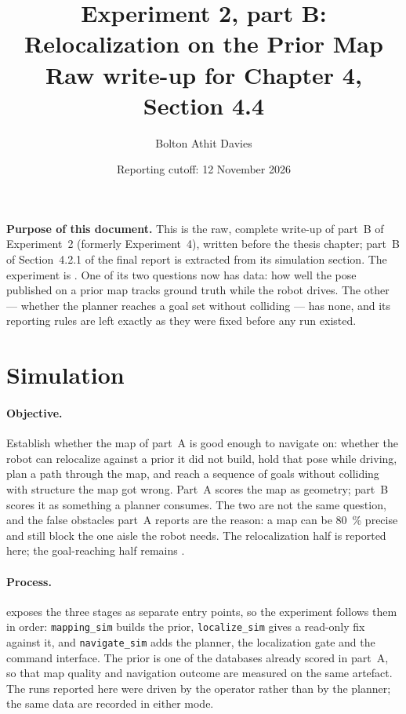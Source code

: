 \documentclass[11pt,a4paper,notitlepage]{report}
\title{Experiment 2, part B: Relocalization on the Prior Map\\
       \large Raw write-up for Chapter 4, Section 4.4}
\author{Bolton Athit Davies}
\date{Reporting cutoff: 12 November 2026}
\begin{document}
\maketitle

\noindent\textbf{Purpose of this document.} This is the raw, complete write-up
of part~B of Experiment~2 (formerly Experiment~4), written before the thesis
chapter; part~B of Section~4.2.1 of the final report is extracted from its
simulation section. The experiment is . One of its two
questions now has data: how well the pose published on a prior map tracks
ground truth while the robot drives. The other --- whether the planner reaches
a goal set without colliding --- has none, and its reporting rules are left
exactly as they were fixed before any run existed.

\FloatBarrier
\section{Simulation}
\label{sec:exp4-sim}


\paragraph{Objective.} Establish whether the map of part~A is good enough to
navigate on: whether the robot can relocalize against a prior it did not build,
hold that pose while driving, plan a path through the map, and reach a sequence
of goals without colliding with structure the map got wrong. Part~A scores the
map as geometry; part~B scores it as something a planner consumes. The two are
not the same question, and the false obstacles part~A reports are the reason: a
map can be
\SI{80}{\percent} precise and still block the one aisle the robot needs. The
relocalization half is reported here; the goal-reaching half remains
.

\paragraph{Process.}  exposes the three stages as
separate entry points, so the experiment follows them in order:
\texttt{mapping\_sim} builds the prior, \texttt{localize\_sim} gives a
read-only fix against it, and \texttt{navigate\_sim} adds the planner, the
localization gate and the command interface. The prior is one of the databases
already scored in part~A, so that map quality and
navigation outcome are measured on the same artefact. The runs reported here
were driven by the operator rather than by the planner; the same data are
recorded in either mode.
\end{document}
